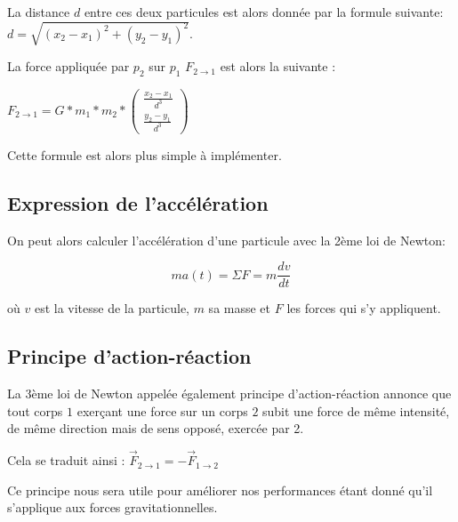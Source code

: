 La distance $d$ entre ces deux particules est alors donnée par la formule suivante:
$d= \sqrt{(x_2-x_1)^2 + (y_2 - y_1)^2}$.

La force appliquée par $p_2$ sur $p_1$ $F_{2 \rightarrow 1}$ est alors la suivante :

\begin{center}
$F_{2 \rightarrow 1}=G*m_1*m_2*\begin{pmatrix}
\frac{x_2 -x_1}{d^3}\\
\frac{y_2 -y_1}{d^3}
\end{pmatrix}
$
\end{center}

\vspace{2mm}
Cette formule est alors plus simple à implémenter.

\vspace{3mm}
\subsection{Expression de l'accélération}
\vspace{2mm}

On peut alors calculer l'accélération d'une particule avec la 2ème loi de Newton:

\begin{equation}
ma(t) = \Sigma F = m \frac{dv}{dt}
\end{equation}

où $v$ est la vitesse de la particule, $m$ sa masse et $F$ les forces qui s'y appliquent.

\vspace{2mm}
\subsection{Principe d'action-réaction}
\vspace{2mm}

La 3ème loi de Newton appelée également principe d'action-réaction annonce que tout corps $1$ exerçant une force sur un corps $2$ subit une force de même intensité, de même direction mais de sens opposé, exercée par 2.

\vspace{2mm}

Cela se traduit ainsi :
$\vec{F}_{2 \rightarrow 1} = -\vec{F}_{1 \rightarrow 2}  $

\vspace{2mm}
Ce principe nous sera utile pour améliorer nos performances étant donné qu'il s'applique aux forces gravitationnelles.


